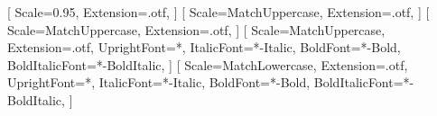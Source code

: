     \newfontface{}[%
    	Scale=0.95,%
    	Extension=.otf,
    	]
    \newfontface{}[%
    	Scale=MatchUppercase,
    	Extension=.otf,
    	]
    \newfontface{}[%
    	Scale=MatchUppercase,
    	Extension=.otf,
     	]
    \newfontface{}[%
    	Scale=MatchUppercase,
    	Extension=.otf,
        UprightFont=*,
        ItalicFont=*-Italic,
        BoldFont=*-Bold,
        BoldItalicFont=*-BoldItalic,
    	]
    \newfontface{}[%
    	Scale=MatchLowercase,%
    	Extension=.otf,
        UprightFont=*,
        ItalicFont=*-Italic,
        BoldFont=*-Bold,
        BoldItalicFont=*-BoldItalic,
    	]
\fi
